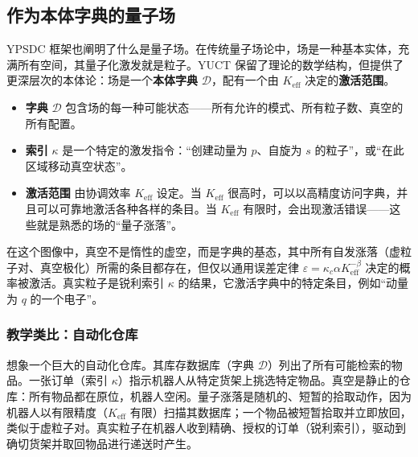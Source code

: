 \documentclass[12pt,a4paper]{article}
\theoremstyle{remark}
\begin{document}
	\medskip
	
	\subsection{作为本体字典的量子场}
	
	YPSDC 框架也阐明了什么是量子场。在传统量子场论中，场是一种基本实体，充满所有空间，其量子化激发就是粒子。YUCT 保留了理论的数学结构，但提供了更深层次的本体论：场是一个\textbf{本体字典} $\mathcal{D}$，配有一个由 $K_{\mathrm{eff}}$ 决定的\textbf{激活范围}。
	
	\begin{itemize}[leftmargin=*]
		\item \textbf{字典} $\mathcal{D}$ 包含场的每一种可能状态——所有允许的模式、所有粒子数、真空的所有配置。
		\item \textbf{索引} $\kappa$ 是一个特定的激发指令：“创建动量为 $p$、自旋为 $s$ 的粒子”，或“在此区域移动真空状态”。
		\item \textbf{激活范围} 由协调效率 $K_{\mathrm{eff}}$ 设定。当 $K_{\mathrm{eff}}$ 很高时，可以以高精度访问字典，并且可以可靠地激活各种各样的条目。当 $K_{\mathrm{eff}}$ 有限时，会出现激活错误——这些就是熟悉的场的“量子涨落”。
	\end{itemize}
	
	在这个图像中，真空不是惰性的虚空，而是字典的基态，其中所有自发涨落（虚粒子对、真空极化）所需的条目都存在，但仅以通用误差定律 $\varepsilon = \kappa_c \alpha K_{\mathrm{eff}}^{-\beta}$ 决定的概率被激活。真实粒子是锐利索引 $\kappa$ 的结果，它激活字典中的特定条目，例如“动量为 $q$ 的一个电子”。
	
	\subsubsection{教学类比：自动化仓库}
	
	想象一个巨大的自动化仓库。其库存数据库（字典 $\mathcal{D}$）列出了所有可能检索的物品。一张订单（索引 $\kappa$）指示机器人从特定货架上挑选特定物品。真空是静止的仓库：所有物品都在原位，机器人空闲。量子涨落是随机的、短暂的拾取动作，因为机器人以有限精度（$K_{\mathrm{eff}}$ 有限）扫描其数据库；一个物品被短暂拾取并立即放回，类似于虚粒子对。真实粒子在机器人收到精确、授权的订单（锐利索引），驱动到确切货架并取回物品进行递送时产生。
	
\end{document}
